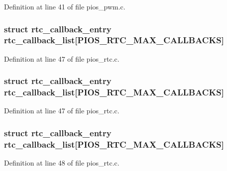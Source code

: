 Definition at line 41 of file pios\-\_\-pwm.\-c.

\hypertarget{group___p_i_o_s___p_w_m_ga4cb0707cdd245f2578d3f444bd852fd7}{
\subsubsection[{rtc\-\_\-callback\-\_\-list}]{\setlength{\rightskip}{0pt plus 5cm}struct {\bf rtc\-\_\-callback\-\_\-entry} rtc\-\_\-callback\-\_\-list\mbox{[}P\-I\-O\-S\-\_\-\-R\-T\-C\-\_\-\-M\-A\-X\-\_\-\-C\-A\-L\-L\-B\-A\-C\-K\-S\mbox{]}}}\label{group___p_i_o_s___p_w_m_ga4cb0707cdd245f2578d3f444bd852fd7}


Definition at line 47 of file pios\-\_\-rtc.\-c.

\hypertarget{group___p_i_o_s___p_w_m_ga4cb0707cdd245f2578d3f444bd852fd7}{
\subsubsection[{rtc\-\_\-callback\-\_\-list}]{\setlength{\rightskip}{0pt plus 5cm}struct {\bf rtc\-\_\-callback\-\_\-entry} rtc\-\_\-callback\-\_\-list\mbox{[}P\-I\-O\-S\-\_\-\-R\-T\-C\-\_\-\-M\-A\-X\-\_\-\-C\-A\-L\-L\-B\-A\-C\-K\-S\mbox{]}}}\label{group___p_i_o_s___p_w_m_ga4cb0707cdd245f2578d3f444bd852fd7}


Definition at line 47 of file pios\-\_\-rtc.\-c.

\hypertarget{group___p_i_o_s___p_w_m_ga4cb0707cdd245f2578d3f444bd852fd7}{
\subsubsection[{rtc\-\_\-callback\-\_\-list}]{\setlength{\rightskip}{0pt plus 5cm}struct {\bf rtc\-\_\-callback\-\_\-entry} rtc\-\_\-callback\-\_\-list\mbox{[}P\-I\-O\-S\-\_\-\-R\-T\-C\-\_\-\-M\-A\-X\-\_\-\-C\-A\-L\-L\-B\-A\-C\-K\-S\mbox{]}}}\label{group___p_i_o_s___p_w_m_ga4cb0707cdd245f2578d3f444bd852fd7}


Definition at line 48 of file pios\-\_\-rtc.\-c.

